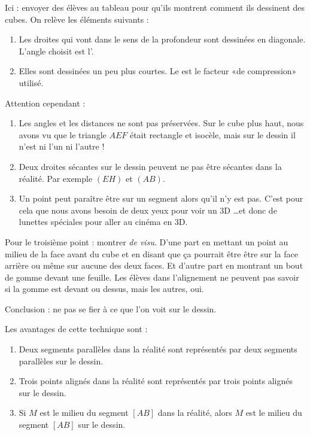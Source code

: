 Ici : envoyer des élèves au tableau pour qu'ils montrent comment ils dessinent des cubes. On relève les éléments suivants :
\begin{enumerate}
    \item
        Les droites qui vont dans le sens de la profondeur sont dessinées en diagonale. L'angle choisit est l'.
    \item
        Elles sont dessinées un peu plus courtes. Le  est le facteur «de compression» utilisé.
\end{enumerate}

Attention cependant : 
\begin{enumerate}
    \item
        Les angles et les distances ne sont pas préservées. Sur le cube plus haut, nous avons vu que le triangle \( AEF\) était rectangle et isocèle, mais sur le dessin il n'est ni l'un ni l'autre !
    \item
        Deux droites sécantes sur le dessin peuvent ne pas être sécantes dans la réalité. Par exemple \( (EH)\) et \( (AB)\).
    \item
        Un point peut paraître être sur un segment alors qu'il n'y est pas. C'est pour cela que nous avons besoin de deux yeux pour voir un 3D \ldots et donc de lunettes spéciales pour aller au cinéma en 3D.
\end{enumerate}
Pour le troisième point : montrer \emph{de visu}. D'une part en mettant un point au milieu de la face avant du cube et en disant que ça pourrait être être sur la face arrière ou même sur aucune des deux faces. Et d'autre part en montrant un bout de gomme devant une feuille. Les élèves dans l'alignement ne peuvent pas savoir si la gomme est devant ou dessus, mais les autres, oui.

Conclusion : ne pas se fier à ce que l'on voit sur le dessin.


Les avantages de cette technique sont :
\begin{propriete}
    \begin{enumerate}
        \item
             Deux segments parallèles dans la réalité sont représentés par deux segments parallèles sur le dessin.
         \item
             Trois points alignés dans la réalité sont représentés par trois points alignés sur le dessin.
         \item
             Si \( M\) est le milieu du segment \( [AB]\) dans la réalité, alors \( M\) est le milieu du segment \( [AB]\) sur le dessin.
    \end{enumerate}
\end{propriete}

